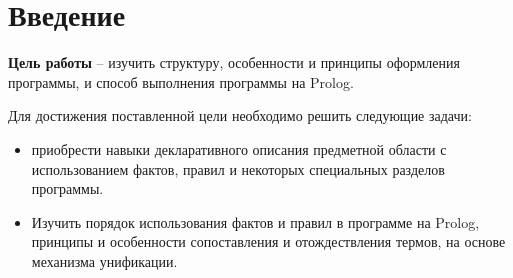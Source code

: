 {\large\section*{Введение}}

\textbf{Цель работы} -- изучить структуру, особенности и принципы оформления программы, и способ выполнения программы на Prolog.

Для достижения поставленной цели необходимо решить следующие задачи:

\begin{itemize}[$\bullet$]
	\item приобрести навыки декларативного описания предметной области с использованием фактов, правил и некоторых специальных разделов программы.
	\item Изучить порядок использования фактов и правил в программе на Prolog, принципы и особенности сопоставления и отождествления термов, на основе механизма унификации.
\end{itemize}
